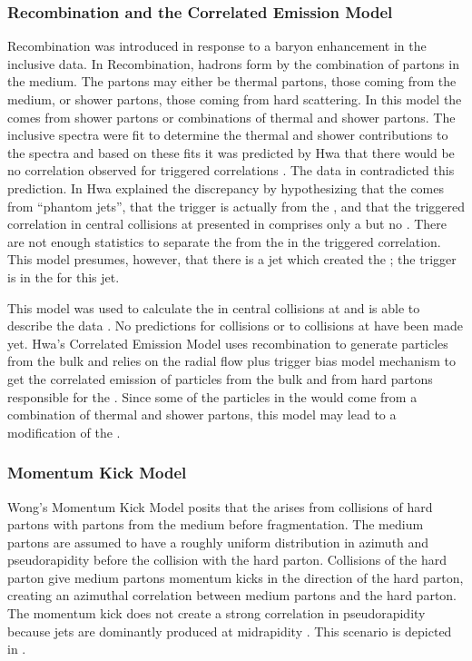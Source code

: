 \subsubsection{Recombination and the Correlated Emission Model}
Recombination was introduced in response to a baryon enhancement in the inclusive data.  In Recombination, hadrons form by the combination of partons in the medium.  The partons may either be thermal partons, those coming from the medium, or shower partons, those coming from hard scattering.  In this model the \jlc comes from shower partons or combinations of thermal and shower partons.  The inclusive spectra were fit to determine the thermal and shower contributions to the spectra and based on these fits it was predicted by Hwa that there would be no correlation observed for \myomega triggered correlations \cite{Hwa:2006vb}.  The data in \cite{bettysthesis,Abelev:2007zp} contradicted this prediction.  In \cite{Chiu:2007zr} Hwa explained the discrepancy by hypothesizing that the \ridge comes from ``phantom jets'', that the \myomega trigger is actually from the \ridge, and that the \myomega triggered correlation in central \Au collisions at \sNNtwohundred presented in \cite{bettysthesis,Abelev:2007zp} comprises only a \ridge but no \jlc.  There are not enough statistics to separate the \jlc from the \ridge in the \myomega triggered correlation.  This model presumes, however, that there is a jet which created the \ridge; the \myomega trigger is in the \ridge for this jet.

This model was used to calculate the \ridge in central \Au collisions at \sNNtwohundred and is able to describe the data \cite{Hwa:2009bh}.  No predictions for \Cu collisions or to collisions at \sNNsixtytwo have been made yet.  Hwa's Correlated Emission Model uses recombination to generate particles from the bulk and relies on the radial flow plus trigger bias model mechanism to get the correlated emission of particles from the bulk and from hard partons responsible for the \ridge \cite{Chiu:2008ht}.  Since some of the particles in the \jlc would come from a combination of thermal and shower partons, this model may lead to a modification of the \jlc.

\subsubsection{Momentum Kick Model}
Wong's Momentum Kick Model \cite{WongMomKick4} posits that the \ridge arises from collisions of hard partons with partons from the medium before fragmentation.  The medium partons are assumed to have a roughly uniform distribution in azimuth and pseudorapidity before the collision with the hard parton.  Collisions of the hard parton give medium partons momentum kicks in the direction of the hard parton, creating an azimuthal correlation between medium partons and the hard parton.  The momentum kick does not create a strong correlation in pseudorapidity because jets are dominantly produced at midrapidity \cite{WongMomKick4,Cheukyin}.  This scenario is depicted in .

